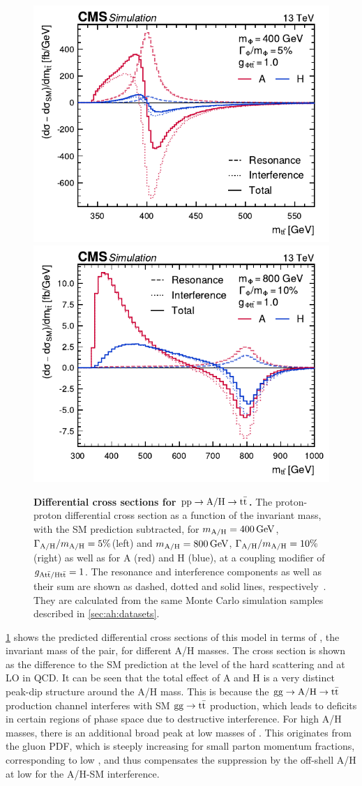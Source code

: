 \begin{figure}[t!]
    \centering
    \includegraphics[width=0.49\linewidth]{figures/ah/ah_xs/ahspectrum_400.pdf}
    \hfill
    \includegraphics[width=0.49\linewidth]{figures/ah/ah_xs/ahspectrum_800.pdf}
    \caption{\textbf{Differential cross sections for $\mathrm{pp} \rightarrow \mathrm{A/H} \rightarrow \mathrm{t \bar{t}}$.} The proton-proton differential cross section as a function of the invariant \ttbar mass, with the SM prediction subtracted, for $m_{\mathrm{A/H}} = \SI{400}{GeV}$, $\Gamma_{\mathrm{A/H}}/m_{\mathrm{A/H}} = 5\%$(left) and $\mAH= \SI{800}{\GeV}$, $\Gamma_{\mathrm{A/H}}/m_{\mathrm{A/H}} = 10\%$ (right) as well as for A (red) and H (blue), at a coupling modifier of $g_{\mathrm{A t \bar{t} / H t \bar{t}}} = 1$. The resonance and interference components as well as their sum are shown as dashed, dotted and solid lines, respectively~\cite{CMS:HIG-22-013}. They are calculated from the same Monte Carlo simulation samples described in \cref{sec:ah:datasets}.}
    \label{fig:theory:ahxs}
\end{figure}

\cref{fig:theory:ahxs} shows the predicted differential cross sections of this model in terms of \mtt, the invariant mass of the \ttbar pair, for different A/H masses. The cross section is shown as the difference to the SM prediction at the level of the hard scattering and at LO in QCD. It can be seen that the total effect of A and H is a very distinct peak-dip structure around the A/H mass. This is because the $\mathrm{gg \rightarrow A/H \rightarrow \mathrm{t \bar{t}}}$ production channel interferes with SM $\mathrm{gg \rightarrow \mathrm{t \bar{t}}}$ production, which leads to deficits in certain regions of phase space due to destructive interference. For high A/H masses, there is an additional broad peak at low masses of \mtt. This originates from the gluon PDF, which is steeply increasing for small parton momentum fractions, corresponding to low \mtt, and thus compensates the suppression by the off-shell A/H at low \mtt for the A/H-SM interference.

